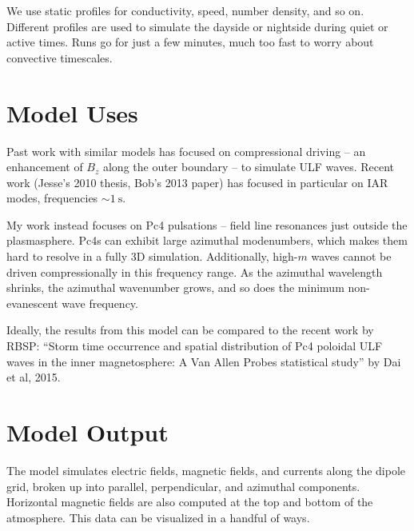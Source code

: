 \documentclass{article}
\begin{document}
We use static profiles for conductivity, \Alfven speed, number density, and so on. Different profiles are used to simulate the dayside or nightside during quiet or active times. Runs go for just a few minutes, much too fast to worry about convective timescales. 

\section{Model Uses}

Past work with similar models has focused on compressional driving -- an enhancement of $B_z$ along the outer boundary -- to simulate ULF waves. Recent work (Jesse's 2010 thesis, Bob's 2013 paper) has focused in particular on IAR modes, frequencies $\sim \SI{1}{\s}$. 

My work instead focuses on Pc4 pulsations -- field line resonances just outside the plasmasphere. Pc4s can exhibit large azimuthal modenumbers, which makes them hard to resolve in a fully 3D simulation. Additionally, high-$m$ \Alfven waves cannot be driven compressionally in this frequency range. As the azimuthal wavelength shrinks, the azimuthal wavenumber grows, and so does the minimum non-evanescent \Alfven wave frequency. 

Ideally, the results from this model can be compared to the recent work by RBSP: ``Storm time occurrence and spatial distribution of Pc4 poloidal ULF waves in the inner magnetosphere: A Van Allen Probes statistical study'' by Dai et al, 2015. 

\section{Model Output}

The model simulates electric fields, magnetic fields, and currents along the dipole grid, broken up into parallel, perpendicular, and azimuthal components. Horizontal magnetic fields are also computed at the top and bottom of the atmosphere. This data can be visualized in a handful of ways. 
\end{document}

